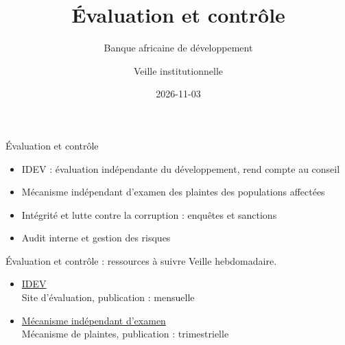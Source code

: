 \documentclass[aspectratio=169,11pt]{beamer}
\title{Évaluation et contrôle}
\subtitle{Banque africaine de développement}
\author{Veille institutionnelle}
\date{2026-11-03}
\begin{document}
\begin{frame}\titlepage\end{frame}

\begin{frame}{Évaluation et contrôle}
\begin{itemize}
\item IDEV : évaluation indépendante du développement, rend compte au conseil
\item Mécanisme indépendant d'examen des plaintes des populations affectées
\item Intégrité et lutte contre la corruption : enquêtes et sanctions
\item Audit interne et gestion des risques
\end{itemize}
\end{frame}

\begin{frame}{Évaluation et contrôle : ressources à suivre}
\small
Veille hebdomadaire.
\begin{itemize}
\item \href{https://idev.afdb.org}{IDEV}\\{\footnotesize Site d'évaluation, publication : mensuelle}
\item \href{https://www.afdb.org/en/independent-review-mechanism}{Mécanisme indépendant d'examen}\\{\footnotesize Mécanisme de plaintes, publication : trimestrielle}
\end{itemize}
\end{frame}
\end{document}

